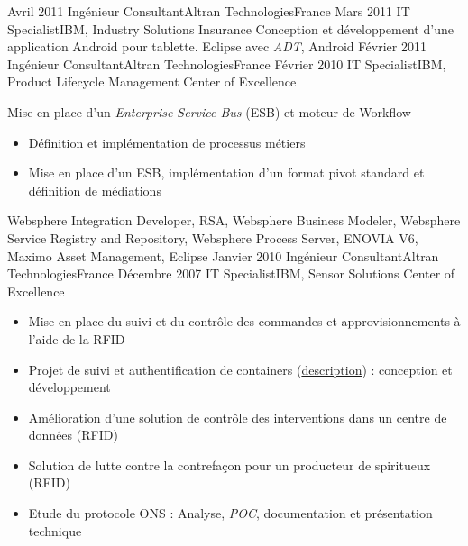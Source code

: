 \begin{experiences}
  \emptySeparator
  \consultantexperience
  {Avril 2011}      {Ingénieur Consultant}{Altran Technologies}{France}
  {Mars 2011}       {IT Specialist}{IBM, Industry Solutions Insurance}
                    {
                      Conception et développement d'une application Android pour tablette. 
                    }
                    {Eclipse avec \emph{ADT}, Android} 
  \emptySeparator   
  \consultantexperience
  {Février 2011}    {Ingénieur Consultant}{Altran Technologies}{France}
  {Février 2010}    {IT Specialist}{IBM, Product Lifecycle Management Center of Excellence}
                    {
                      Mise en place d'un \emph{Enterprise Service Bus} (ESB) et moteur de Workflow
                      \begin{itemize}
                        \item Définition et implémentation de processus métiers                           
                        \item Mise en place d'un ESB, implémentation d'un format pivot standard et définition de médiations
                      \end{itemize}
                    }
                    {
                      Websphere Integration Developer, RSA, Websphere Business Modeler, Websphere Service Registry and Repository, 
                      Websphere Process Server, ENOVIA V6, Maximo Asset Management, Eclipse
                    }   
  \emptySeparator            
  \consultantexperience
  {Janvier 2010}    {Ingénieur Consultant}{Altran Technologies}{France}
  {Décembre 2007}   {IT Specialist}{IBM, Sensor Solutions Center of Excellence}
                    {
                      \begin{itemize}
                        \item Mise en place du suivi et du contrôle des commandes et approvisionnements à l'aide de la RFID
                        \item Projet de suivi et authentification de containers (\href{http://www.container-centralen.co.uk/rfid/history.aspx}{description}) : conception et développement
                        \item Amélioration d'une solution de contrôle des interventions dans un centre de données (RFID)
                        \item Solution de lutte contre la contrefaçon pour un producteur de spiritueux (RFID)           
                        \item Etude du protocole ONS : Analyse, \emph{POC}, documentation et présentation technique     

\end{itemize}}
\end{experiences}
